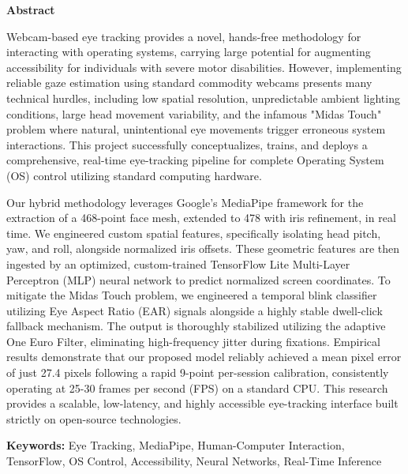 \documentclass[12pt,a4paper]{report}
\begin{document}
\newpage
{}
\begin{center}
    \textbf{\large Abstract}
\end{center}
\vspace{0.5cm}
Webcam-based eye tracking provides a novel, hands-free methodology for interacting with operating systems, carrying large potential for augmenting accessibility for individuals with severe motor disabilities. However, implementing reliable gaze estimation using standard commodity webcams presents many technical hurdles, including low spatial resolution, unpredictable ambient lighting conditions, large head movement variability, and the infamous "Midas Touch" problem where natural, unintentional eye movements trigger erroneous system interactions. This project successfully conceptualizes, trains, and deploys a comprehensive, real-time eye-tracking pipeline for complete Operating System (OS) control utilizing standard computing hardware. 

Our hybrid methodology leverages Google's MediaPipe framework for the extraction of a 468-point face mesh, extended to 478 with iris refinement, in real time. We engineered custom spatial features, specifically isolating head pitch, yaw, and roll, alongside normalized iris offsets. These geometric features are then ingested by an optimized, custom-trained TensorFlow Lite Multi-Layer Perceptron (MLP) neural network to predict normalized screen coordinates. To mitigate the Midas Touch problem, we engineered a temporal blink classifier utilizing Eye Aspect Ratio (EAR) signals alongside a highly stable dwell-click fallback mechanism. The output is thoroughly stabilized utilizing the adaptive One Euro Filter, eliminating high-frequency jitter during fixations. Empirical results demonstrate that our proposed model reliably achieved a mean pixel error of just 27.4 pixels following a rapid 9-point per-session calibration, consistently operating at 25-30 frames per second (FPS) on a standard CPU. This research provides a scalable, low-latency, and highly accessible eye-tracking interface built strictly on open-source technologies.

\textbf{Keywords:} Eye Tracking, MediaPipe, Human-Computer Interaction, TensorFlow, OS Control, Accessibility, Neural Networks, Real-Time Inference

\newpage
\tableofcontents
\end{document}
